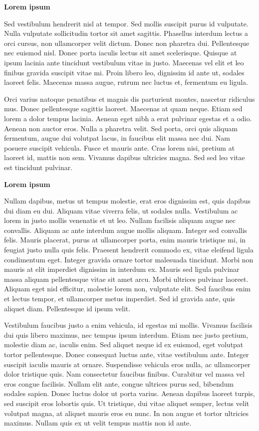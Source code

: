 \documentclass[
]{book}
\begin{document}
\textbf{Lorem ipsum}

Sed vestibulum hendrerit nisl at tempor. Sed mollis suscipit purus id
vulputate. Nulla vulputate sollicitudin tortor sit amet sagittis.
Phasellus interdum lectus a orci cursus, non ullamcorper velit dictum.
Donec non pharetra dui. Pellentesque nec euismod nisl. Donec porta
iaculis lectus sit amet scelerisque. Quisque at ipsum lacinia ante
tincidunt vestibulum vitae in justo. Maecenas vel elit et leo finibus
gravida suscipit vitae mi. Proin libero leo, dignissim id ante ut,
sodales laoreet felis. Maecenas massa augue, rutrum nec luctus et,
fermentum eu ligula.

Orci varius natoque penatibus et magnis dis parturient montes, nascetur
ridiculus mus. Donec pellentesque sagittis laoreet. Maecenas at quam
neque. Etiam sed lorem a dolor tempus lacinia. Aenean eget nibh a erat
pulvinar egestas et a odio. Aenean non auctor eros. Nulla a pharetra
velit. Sed porta, orci quis aliquam fermentum, augue dui volutpat lacus,
in faucibus elit massa nec dui. Nam posuere suscipit vehicula. Fusce et
mauris ante. Cras lorem nisi, pretium at laoreet id, mattis non sem.
Vivamus dapibus ultricies magna. Sed sed leo vitae est tincidunt
pulvinar.

\textbf{Lorem ipsum}

Nullam dapibus, metus ut tempus molestie, erat eros dignissim est, quis
dapibus dui diam eu dui. Aliquam vitae viverra felis, ut sodales nulla.
Vestibulum ac lorem in justo mollis venenatis et ut leo. Nullam
facilisis aliquam augue nec convallis. Aliquam ac ante interdum augue
mollis aliquam. Integer sed convallis felis. Mauris placerat, purus at
ullamcorper porta, enim mauris tristique mi, in feugiat justo nulla quis
felis. Praesent hendrerit commodo ex, vitae eleifend ligula condimentum
eget. Integer gravida ornare tortor malesuada tincidunt. Morbi non
mauris at elit imperdiet dignissim in interdum ex. Mauris sed ligula
pulvinar massa aliquam pellentesque vitae sit amet arcu. Morbi ultrices
pulvinar laoreet. Aliquam eget nisl efficitur, molestie lorem non,
vulputate elit. Sed faucibus enim et lectus tempor, et ullamcorper metus
imperdiet. Sed id gravida ante, quis aliquet diam. Pellentesque id ipsum
velit.

Vestibulum faucibus justo a enim vehicula, id egestas mi mollis. Vivamus
facilisis dui quis libero maximus, nec tempus ipsum interdum. Etiam nec
justo pretium, molestie diam ac, iaculis enim. Sed aliquet neque id ex
euismod, eget volutpat tortor pellentesque. Donec consequat luctus ante,
vitae vestibulum ante. Integer suscipit iaculis mauris at ornare.
Suspendisse vehicula eros nulla, ac ullamcorper dolor tristique quis.
Nam consectetur faucibus finibus. Curabitur vel massa vel eros congue
facilisis. Nullam elit ante, congue ultrices purus sed, bibendum sodales
sapien. Donec luctus dolor ut porta varius. Aenean dapibus laoreet
turpis, sed suscipit eros lobortis quis. Ut tristique, dui vitae aliquet
semper, lectus velit volutpat magna, at aliquet mauris eros eu nunc. In
non augue et tortor ultricies maximus. Nullam quis ex ut velit tempus
mattis non id ante.
\end{document}
